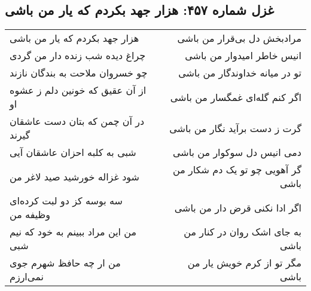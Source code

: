 \begin{center}
\section*{غزل شماره ۴۵۷: هزار جهد بکردم که یار من باشی}
\label{sec:sh457}
\begin{longtable}{l p{0.5cm} r}
هزار جهد بکردم که یار من باشی
&&
مرادبخش دل بی‌قرار من باشی
\\
چراغ دیده شب زنده دار من گردی
&&
انیس خاطر امیدوار من باشی
\\
چو خسروان ملاحت به بندگان نازند
&&
تو در میانه خداوندگار من باشی
\\
از آن عقیق که خونین دلم ز عشوه او
&&
اگر کنم گله‌ای غمگسار من باشی
\\
در آن چمن که بتان دست عاشقان گیرند
&&
گرت ز دست برآید نگار من باشی
\\
شبی به کلبه احزان عاشقان آیی
&&
دمی انیس دل سوکوار من باشی
\\
شود غزاله خورشید صید لاغر من
&&
گر آهویی چو تو یک دم شکار من باشی
\\
سه بوسه کز دو لبت کرده‌ای وظیفه من
&&
اگر ادا نکنی قرض دار من باشی
\\
من این مراد ببینم به خود که نیم شبی
&&
به جای اشک روان در کنار من باشی
\\
من ار چه حافظ شهرم جوی نمی‌ارزم
&&
مگر تو از کرم خویش یار من باشی
\\
\end{longtable}
\end{center}
